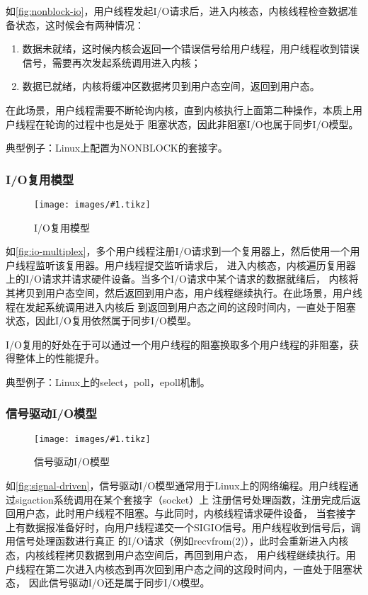 \documentclass[supercite]{HustGraduPaper}
\newcommand{\cfig}[3]{
  \begin{figure}[htb]
    \centering
    \texttt{[image: images/\#1.tikz]}
    \caption{#3}
    \label{fig:#1}
  \end{figure}
}
\newcommand{\rfig}[1]{\autoref{fig:#1}}
\theoremstyle{definition}
\begin{document}
如\rfig{nonblock-io}，用户线程发起I/O请求后，进入内核态，内核线程检查数据准备状态，这时候会有两种情况：

\begin{enumerate}[label={(\arabic*)}]
  \item 数据未就绪，这时候内核会返回一个错误信号给用户线程，用户线程收到错误信号，需要再次发起系统调用进入内核；
  \item 数据已就绪，内核将缓冲区数据拷贝到用户态空间，返回到用户态。
\end{enumerate}

在此场景，用户线程需要不断轮询内核，直到内核执行上面第二种操作，本质上用户线程在轮询的过程中也是处于
阻塞状态，因此非阻塞I/O也属于同步I/O模型。\par

典型例子：Linux上配置为NONBLOCK的套接字。\par

\subsubsection{I/O复用模型}
\cfig{io-multiplex}{0.7}{I/O复用模型}

如\rfig{io-multiplex}，多个用户线程注册I/O请求到一个复用器上，然后使用一个用户线程监听该复用器。用户线程提交监听请求后，
进入内核态，内核遍历复用器上的I/O请求并请求硬件设备。当多个I/O请求中某个请求的数据就绪后，
内核将其拷贝到用户态空间，然后返回到用户态，用户线程继续执行。在此场景，用户线程在发起系统调用进入内核后
到返回到用户态之间的这段时间内，一直处于阻塞状态，因此I/O复用依然属于同步I/O模型。\par

I/O复用的好处在于可以通过一个用户线程的阻塞换取多个用户线程的非阻塞，获得整体上的性能提升。\par

典型例子：Linux上的select，poll，epoll机制。\par

\subsubsection{信号驱动I/O模型}
\cfig{signal-driven}{0.7}{信号驱动I/O模型}

如\rfig{signal-driven}，信号驱动I/O模型通常用于Linux上的网络编程。用户线程通过sigaction系统调用在某个套接字（socket）上
注册信号处理函数，注册完成后返回用户态，此时用户线程不阻塞。与此同时，内核线程请求硬件设备，
当套接字上有数据报准备好时，向用户线程递交一个SIGIO信号。用户线程收到信号后，调用信号处理函数进行真正
的I/O请求（例如recvfrom(2)），此时会重新进入内核态，内核线程拷贝数据到用户态空间后，再回到用户态，
用户线程继续执行。用户线程在第二次进入内核态到再次回到用户态之间的这段时间内，一直处于阻塞状态，
因此信号驱动I/O还是属于同步I/O模型。\par
\end{document}
